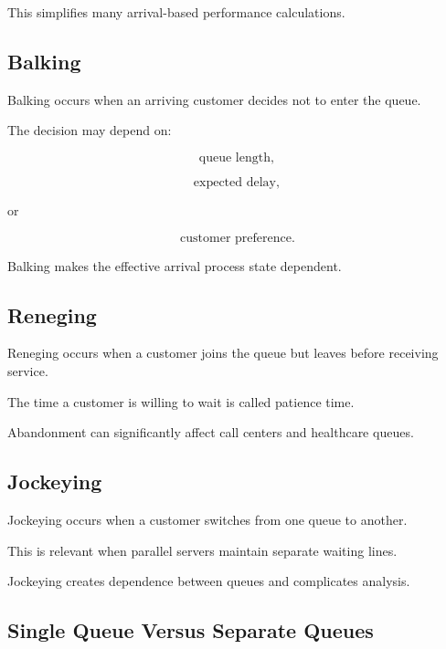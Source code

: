 This simplifies many arrival-based performance calculations.

\subsection{Balking}
\label{subsec:balking}

Balking occurs when an arriving customer decides not to enter the queue.

The decision may depend on:

\[
\boxed{
\text{queue length},
}
\]

\[
\boxed{
\text{expected delay},
}
\]

or

\[
\boxed{
\text{customer preference}.
}
\]

Balking makes the effective arrival process state dependent.

\subsection{Reneging}
\label{subsec:reneging}

Reneging occurs when a customer joins the queue but leaves before receiving
service.

The time a customer is willing to wait is called patience time.

Abandonment can significantly affect call centers and healthcare queues.

\subsection{Jockeying}
\label{subsec:jockeying}

Jockeying occurs when a customer switches from one queue to another.

This is relevant when parallel servers maintain separate waiting lines.

Jockeying creates dependence between queues and complicates analysis.

\subsection{Single Queue Versus Separate Queues}
\label{subsec:single-versus-separate-queues}

